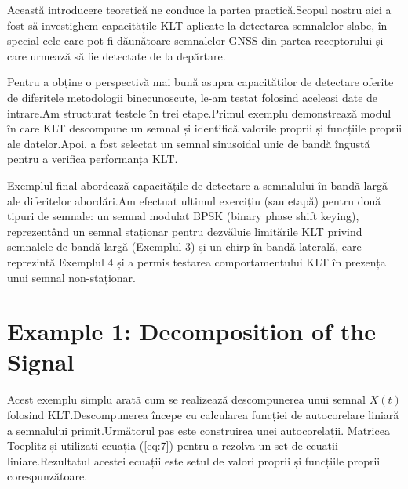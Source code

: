\documentclass[12pt]{report}
\begin{document}
Această introducere teoretică ne conduce la partea practică.\@ Scopul nostru aici a fost să investighem capacitățile KLT aplicate la detectarea semnalelor slabe, în special cele care pot fi dăunătoare semnalelor GNSS din partea receptorului și care urmează să fie detectate de la depărtare.

Pentru a obține o perspectivă mai bună asupra capacităților de detectare oferite de diferitele metodologii binecunoscute, le-am testat folosind aceleași date de intrare.\@ Am structurat testele în trei etape.\@ Primul exemplu demonstrează modul în care KLT descompune un semnal și identifică valorile proprii și funcțiile proprii ale datelor.\@ Apoi, a fost selectat un semnal sinusoidal unic de bandă îngustă pentru a verifica performanța KLT.\@

Exemplul final abordează capacitățile de detectare a semnalului în bandă largă ale diferitelor abordări.\@ Am efectuat ultimul exercițiu (sau etapă) pentru două tipuri de semnale: un semnal modulat BPSK (binary phase shift keying), reprezentând un semnal staționar pentru dezvăluie limitările KLT privind semnalele de bandă largă (Exemplul 3) și un chirp în bandă laterală, care reprezintă Exemplul 4 și a permis testarea comportamentului KLT în prezența unui semnal non-staționar.

\section*{Example 1: Decomposition of the Signal}

Acest exemplu simplu arată cum se realizează descompunerea unui semnal $X(t)$ folosind KLT.\@ Descompunerea începe cu calcularea funcției de autocorelare liniară a semnalului primit.\@ Următorul pas este construirea unei autocorelații. Matricea Toeplitz și utilizați ecuația (\ref{eq:7}) pentru a rezolva un set de ecuații liniare.\@ Rezultatul acestei ecuații este setul de valori proprii și funcțiile proprii corespunzătoare.
\end{document}
